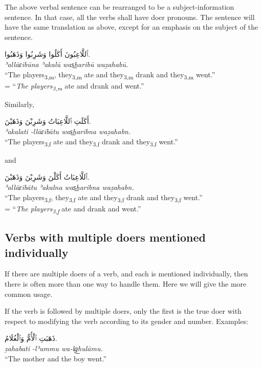 \documentclass[
  10pt,
]{book}
\begin{document}
The above verbal sentence can be rearranged to be a subject-information sentence. In that case, all the verbs shall have doer pronouns. The sentence will have the same translation as above, except for an emphasis on the subject of the sentence.

\foreignlanguage{arabic}{ٱَللَّاعِبُونَ أَکَلُوا وَشَرِبُوا وَذَهَبُوا.}\\
\emph{ʾallāɛibūna ʾakalū was͟haribū waẕahabū.}\\
\enquote{The players\textsubscript{3,m}, they\textsubscript{3,m} ate and they\textsubscript{3,m} drank and they\textsubscript{3,m} went.}\\
= \enquote{\emph{The players\textsubscript{3,m}} ate and drank and went.}

Similarly,

\foreignlanguage{arabic}{أَکَلَتِ ٱللَّاعِبَاتُ وَشَرِبْنَ وَذَهَبْنَ.}\\
\emph{ʾakalati -llāɛibātu was͟haribna waẕahabn.}\\
\enquote{The players\textsubscript{3,f} ate and they\textsubscript{3,f} drank and they\textsubscript{3,f} went.}

and

\foreignlanguage{arabic}{ٱَللَّاعِبَاتُ أَکَلْنَ وَشَرِبْنَ وَذَهَبْنَ.}\\
\emph{ʾallāɛibātu ʾakalna was͟haribna waẕahabn.}\\
\enquote{The players\textsubscript{3,f}, they\textsubscript{3,f} ate and they\textsubscript{3,f} drank and they\textsubscript{3,f} went.}\\
= \enquote{\emph{The players\textsubscript{3,f}} ate and drank and went.}

\subsection{Verbs with multiple doers mentioned individually}\label{verbs-with-multiple-doers-mentioned-individually}

If there are multiple doers of a verb, and each is mentioned individually, then there is often more than one way to handle them. Here we will give the more common usage.

If the verb is followed by multiple doers, only the first is the true doer with respect to modifying the verb according to its gender and number. Examples:

\foreignlanguage{arabic}{ذَهَبَتِ ٱلْأُمُّ وَٱلْغُلَامُ.}\\
\emph{ẕahabati -lʾummu wa-lg͟hulāmu.}\\
\enquote{The mother and the boy went.}
\end{document}
